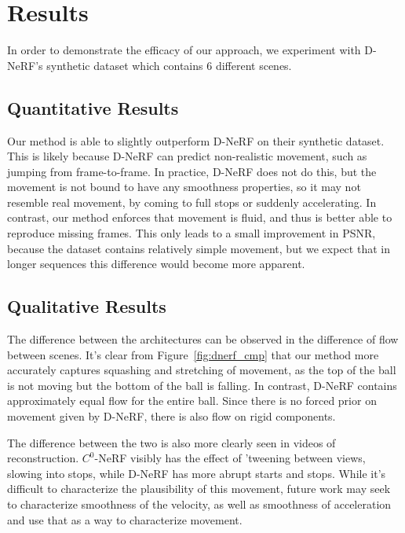 \section*{Results}

In order to demonstrate the efficacy of our approach, we experiment with D-NeRF's synthetic
dataset which contains 6 different scenes.

\subsection*{Quantitative Results}

Our method is able to slightly outperform D-NeRF on their synthetic dataset. This is likely because D-NeRF can predict non-realistic movement, such as jumping from frame-to-frame. In practice, D-NeRF does not do this, but the movement is not bound to have any smoothness properties, so it may not resemble real movement, by coming to full stops or suddenly accelerating. In contrast, our method enforces that movement is fluid, and thus is better able to reproduce missing frames. This only leads to a small improvement in PSNR, because the dataset contains relatively simple movement, but we expect that in longer sequences this difference would become more apparent.

\subsection*{Qualitative Results}

The difference between the architectures can be observed in the difference of flow between scenes. It's clear from Figure~\ref{fig:dnerf_cmp} that our method more accurately captures squashing and stretching of movement, as the top of the ball is not moving but the bottom of the ball is falling. In contrast, D-NeRF contains approximately equal flow for the entire ball. Since there is no forced prior on movement given by D-NeRF, there is also flow on rigid components.

The difference between the two is also more clearly seen in videos of reconstruction. $C^0$-NeRF visibly has the effect of 'tweening between views, slowing into stops, while D-NeRF has more abrupt starts and stops. While it's difficult to characterize the plausibility of this movement, future work may seek to characterize smoothness of the velocity, as well as smoothness of acceleration and use that as a way to characterize movement.

